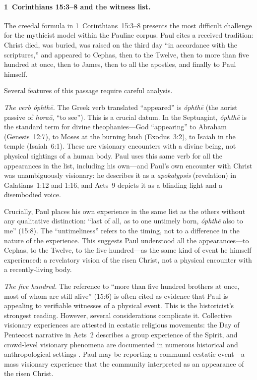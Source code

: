 \documentclass[12pt,oneside]{article}
\newcommand{\grk}[1]{\textit{#1}}   %
\begin{document}
\paragraph{1~Corinthians 15:3--8 and the witness list.}
The creedal formula in 1~Corinthians~15:3--8 presents the most
difficult challenge for the mythicist model within the Pauline corpus.
Paul cites a received tradition: Christ died, was buried, was raised on
the third day ``in accordance with the scriptures,'' and appeared to
Cephas, then to the Twelve, then to more than five hundred at once,
then to James, then to all the apostles, and finally to Paul himself.

Several features of this passage require careful analysis.

\textit{The verb \grk{\'ophth\=e}.}  The Greek verb translated
``appeared'' is \grk{\'ophth\=e} (the aorist passive of \grk{hora\=o},
``to see'').  This is a crucial datum.  In the Septuagint,
\grk{\'ophth\=e} is the standard term for divine theophanies---God
``appearing'' to Abraham (Genesis~12:7), to Moses at the burning bush
(Exodus~3:2), to Isaiah in the temple (Isaiah~6:1).  These are
visionary encounters with a divine being, not physical sightings of a
human body.  Paul uses this same verb for all the appearances in the
list, including his own---and Paul's own encounter with Christ was
unambiguously visionary: he describes it as a \grk{apokalypsis}
(revelation) in Galatians~1:12 and 1:16, and Acts~9 depicts it as a
blinding light and a disembodied voice.

Crucially, Paul places his own experience in the same list as the
others without any qualitative distinction: ``last of all, as to one
untimely born, \grk{\'ophth\=e} also to me'' (15:8).  The
``untimeliness'' refers to the timing, not to a difference in the
nature of the experience.  This suggests Paul understood all the
appearances---to Cephas, to the Twelve, to the five hundred---as the
same kind of event he himself experienced: a revelatory vision of the
risen Christ, not a physical encounter with a recently-living body.

\textit{The five hundred.}  The reference to ``more than five hundred
brothers at once, most of whom are still alive'' (15:6) is often cited
as evidence that Paul is appealing to verifiable witnesses of a
physical event.  This is the historicist's strongest reading.  However,
several considerations complicate it.  Collective visionary experiences
are attested in ecstatic religious movements: the Day of Pentecost
narrative in Acts~2 describes a group experience of the Spirit, and
crowd-level visionary phenomena are documented in numerous historical
and anthropological settings \citep{Lewis1971}.  Paul may be reporting
a communal ecstatic event---a mass visionary experience that the
community interpreted as an appearance of the risen Christ.
\end{document}
